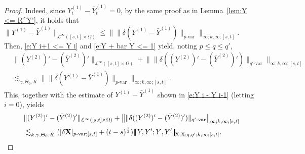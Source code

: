 \documentclass[11pt,reqno]{amsart}
\numberwithin{equation}{section}
\newcommand{\shortthickbar}{%
  \vcenter{\hbox{\rule{1.8pt}{2.2ex}}}%
}
\newcommand{\thicknm}[1]{%
  \mathopen{\shortthickbar}%
  \mkern4mu #1 \mkern4mu%
  \mathclose{\shortthickbar}%
}
\begin{document}
\begin{proof}
Indeed, since $Y^{(1)}_t - \bar Y^{(1)}_t = 0$, by the same proof as in Lemma~\ref{lem:Y <= R^Y'}, it holds that $\|Y^{(1)} - \bar Y^{(1)}\|_{\mathcal L^{\infty}([s,t] \times \Omega)} \le \| \|\delta (Y^{(1)} - \bar Y^{(1)})\|_{p\text{-}\mathrm{var}} \|_{\infty;k,\infty;[s,t]}$. Then, \eqref{e:Y i+1 <= Y i} and \eqref{e:Y + bar Y <= 1} yield, noting $p\le q\le q'$, 
\begin{equation*}
\begin{aligned}
&\|(Y^{(2)})' - (\bar Y^{(2)})'\|_{\mathcal L^{\infty}([s,t]\times\Omega)} + \big\| \|\delta ((Y^{(2)})' - (\bar Y^{(2)})') \|_{q'\text{-}\mathrm{var}}\big\|_{\infty;k,\infty;[s,t]} \\
&\lesssim_{\gamma,\Theta_0,\hat K} \big\| \|\delta (Y^{(1)} - \bar Y^{(1)})\|_{p\text{-}\mathrm{var}} \big\|_{\infty;k,\infty;[s,t]}.
\end{aligned}
\end{equation*}
This, together with the estimate of $Y^{(1)} - \bar Y^{(1)}$ shown in  \eqref{e:Y i - Y i-1} (letting $i = 0$), yields  
\begin{equation}\label{H Y 2 - H Y 1}
\begin{aligned}
&\|(Y^{(2)})' - (\bar Y^{(2)})'\|_{\mathcal L^{\infty}([s,t]\times\Omega)} + \big\| \|\delta( (Y^{(2)})' - (\bar Y^{(2)})' )\|_{q'\text{-}\mathrm{var}} \big\|_{\infty;k,\infty;[s,t]} \\
&\lesssim_{k,\gamma,\Theta_0,\hat K} (|\delta \mathbf X|_{p\text{-}\mathrm{var};[s,t]} + (t-s)^{\frac{1}{2}}) \, \thicknm{Y,Y';  \bar Y,\bar Y'}_{\mathrm X,\mathrm X;q,q';k,\infty;[s,t]}.
\end{aligned}
\end{equation}


\end{proof}
\end{document}
